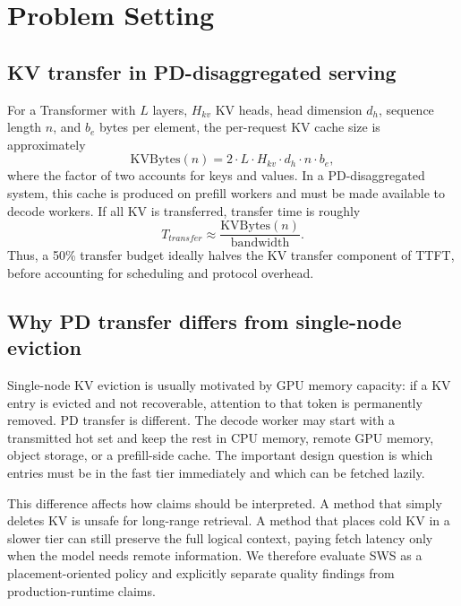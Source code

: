 \documentclass[11pt]{article}
\newcommand{\method}{SWS}
\newcommand{\pct}{\%}
\theoremstyle{definition}
\theoremstyle{plain}
\begin{document}
\section{Problem Setting}
\label{sec:problem}

\subsection{KV transfer in PD-disaggregated serving}
For a Transformer with $L$ layers, $H_{kv}$ KV heads, head dimension $d_h$, sequence length $n$, and $b_e$ bytes per element, the per-request KV cache size is approximately
\begin{equation}
  \mathrm{KVBytes}(n) = 2 \cdot L \cdot H_{kv} \cdot d_h \cdot n \cdot b_e,
\end{equation}
where the factor of two accounts for keys and values.  In a PD-disaggregated system, this cache is produced on prefill workers and must be made available to decode workers.  If all KV is transferred, transfer time is roughly
\begin{equation}
  T_{transfer} \approx \frac{\mathrm{KVBytes}(n)}{\mathrm{bandwidth}}.
\end{equation}
Thus, a 50\pct{} transfer budget ideally halves the KV transfer component of TTFT, before accounting for scheduling and protocol overhead.

\subsection{Why PD transfer differs from single-node eviction}
Single-node KV eviction is usually motivated by GPU memory capacity: if a KV entry is evicted and not recoverable, attention to that token is permanently removed.  PD transfer is different.  The decode worker may start with a transmitted hot set and keep the rest in CPU memory, remote GPU memory, object storage, or a prefill-side cache.  The important design question is which entries must be in the fast tier immediately and which can be fetched lazily.

This difference affects how claims should be interpreted.  A method that simply deletes KV is unsafe for long-range retrieval.  A method that places cold KV in a slower tier can still preserve the full logical context, paying fetch latency only when the model needs remote information.  We therefore evaluate \method{} as a placement-oriented policy and explicitly separate quality findings from production-runtime claims.
\end{document}
